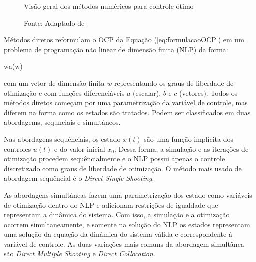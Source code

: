 \begin{figure}[h]
	\centering
	\caption{Visão geral dos métodos numéricos para controle ótimo}
	\label{fig:diagrama_metodos_numericos}
	\caption*{\footnotesize Fonte: Adaptado de \citeauthor{article:Diehl}}
\end{figure}

Métodos diretos reformulam o OCP da Equação (\ref{eq:formulacaoOCP}) em um problema de programação não linear de dimensão finita (NLP) da forma:

\begin{mini!}
	{w}{a(w) \label{eq:NPL1}}
	{\label{eq:NPL}}{}
\end{mini!}

com um vetor de dimensão finita $w$ representando os graus de liberdade de otimização e com funções diferenciáveis $a$ (escalar), $b$ e $c$ (vetores). 
Todos os métodos diretos começam por uma parametrização da variável de controle, mas diferem na forma como os estados são tratados. Podem ser classificados em duas abordagems, sequnciais e simultâneos. 

Nas abordagens sequênciais, os estado $x(t)$ são uma função implícita dos controles $u(t)$ e do valor inicial $x_0$. Dessa forma, a simulação
e as iterações de otimização procedem sequêncialmente e o NLP possui apenas o controle discretizado como graus de liberdade de otimização. O método mais usado de abordagem sequêncial é o \textit{Direct Single Shooting}.

As abordagens simultâneas fazem uma parametrização dos estado como variáveis de otimização dentro do NLP e adicionam restrições de igualdade que representam a dinâmica do sistema. 
Com isso, a simulação e a otimização ocorrem simultaneamente, e somente na solução do NLP os estados representam uma solução da equação da dinâmica do sistema válida e
correspondente à variável de controle. As duas variações mais comuns da abordagem simultânea são \textit{Direct Multiple Shooting} e \textit{Direct Collocation}.

